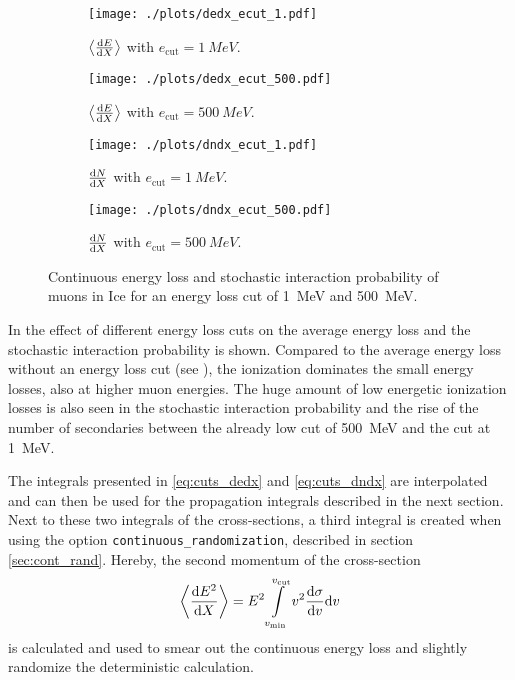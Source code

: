\begin{figure}
    \centering
    \begin{subfigure}[t]{0.47\textwidth}
        \centering
        \texttt{[image: ./plots/dedx\_ecut\_1.pdf]}
        \caption{$\left\langle \frac{\mathrm{d} E}{\mathrm{d} X} \right\rangle$ with $e_{\text{cut}} = \SI{1}{MeV}$.}
        \label{fig:dedx_ecut_1}
        \vspace{0.5cm}
    \end{subfigure}
    \hfill
    \begin{subfigure}[t]{0.47\textwidth}
        \centering
        \texttt{[image: ./plots/dedx\_ecut\_500.pdf]}
        \caption{$\left\langle \frac{\mathrm{d} E}{\mathrm{d} X} \right\rangle$ with $e_{\text{cut}} = \SI{500}{MeV}$.}
        \label{fig:dedx_ecut_500}
        \vspace{0.5cm}
    \end{subfigure}
    \begin{subfigure}[t]{0.47\textwidth}
        \centering
        \texttt{[image: ./plots/dndx\_ecut\_1.pdf]}
        \caption{$\frac{\mathrm{d} N}{\mathrm{d} X}$ with $e_{\text{cut}} = \SI{1}{MeV}$.}
        \label{fig:dndx_ecut_1}
    \end{subfigure}
    \hfill
    \begin{subfigure}[t]{0.47\textwidth}
        \centering
        \texttt{[image: ./plots/dndx\_ecut\_500.pdf]}
        \caption{$\frac{\mathrm{d} N}{\mathrm{d} X}$ with $e_{\text{cut}} = \SI{500}{MeV}$.}
        \label{fig:dndx_ecut_500}
        \vspace{0.5cm}
    \end{subfigure}
    \caption{Continuous energy loss and stochastic interaction probability of muons in Ice for an energy loss cut of \SI{1}{MeV} and \SI{500}{MeV}.}
    \label{fig:dedx_dndx_ecuts}
\end{figure}

In  the effect of different energy loss cuts on the average energy loss and the stochastic interaction probability is shown.
Compared to the average energy loss without an energy loss cut (see ), the ionization dominates the small energy losses, also at higher muon energies.
The huge amount of low energetic ionization losses is also seen in the stochastic interaction probability and the rise of the number of secondaries between the already low cut of \SI{500}{MeV} and the cut at \SI{1}{MeV}.

The integrals presented in \eqref{eq:cuts_dedx} and \eqref{eq:cuts_dndx} are interpolated and can then be used for the propagation integrals described in the next section.
Next to these two integrals of the cross-sections, a third integral is created when using the option \texttt{continuous\_randomization}, described in section \ref{sec:cont_rand}.
Hereby, the second momentum of the cross-section
\begin{align} \label{eq:ecut_de2dx}
    \left\langle \frac{\mathrm{d} E^2}{\mathrm{d} X} \right\rangle = E^2 \int\limits_{v_{\min}}^{v_{\textrm{cut}}} v^2 \frac{\mathrm{d} \sigma}{\mathrm{d} v} \mathrm{d} v
\end{align}
is calculated and used to smear out the continuous energy loss and slightly randomize the deterministic calculation.

